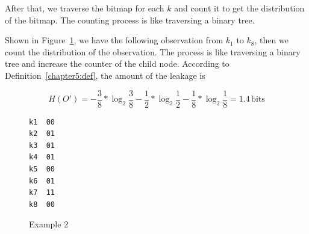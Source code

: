 After that, we traverse the bitmap for each $k$ and count it to get the distribution of the bitmap. The counting process is like traversing a binary tree.

\begin{myexample}
Shown in Figure~\ref{fig:design:example2}, we have the following observation from $k_1$ to $k_8$, then we count the distribution of  the observation. The process is like traversing a binary tree and increase the counter of the child node. According to Definition~\ref{chapter5:def}, the amount of the leakage is

\begin{displaymath}
  H(O') = - \frac{3}{8}*\log_2{\frac{3}{8}}- \frac{1}{2}*\log_2{\frac{1}{2}}
  - \frac{1}{8}*\log_2{\frac{1}{8}} = 1.4 \,\mathrm{bits}
\end{displaymath}

\begin{figure}[h]
  \begin{minipage}{0.4\linewidth}
    \end{minipage}
  \hfill
  \begin{minipage}{0.18\linewidth}
    {
      \begin{lstlisting}[frame=none, numbers=none]
k1  00
k2  01
k3  01
k4  01
k5  00
k6  01
k7  11
k8  00
\end{lstlisting}
    }
  \end{minipage}
  \hfill
  \begin{minipage}{0.30\linewidth}
  \end{minipage}
  \caption{Example 2}\label{fig:design:example2}
\end{figure}
\end{myexample}


